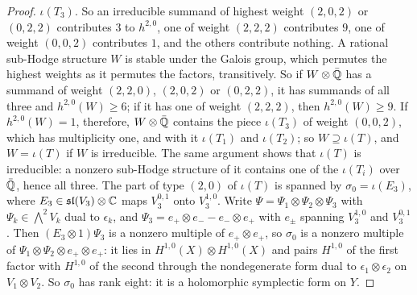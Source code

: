 \begin{proof}
$\iota(T_{3})$. So an irreducible summand of highest weight $(2,0,2)$ or
$(0,2,2)$ contributes $3$ to $h^{2,0}$, one of weight $(2,2,2)$ contributes
$9$, one of weight $(0,0,2)$ contributes $1$, and the others contribute
nothing. A rational sub-Hodge structure $W$ is stable under the Galois group,
which permutes the highest weights as it permutes the factors, transitively.
So if $W\otimes\bar{\mathbb{Q}}$ has a summand of weight $(2,2,0)$, $(2,0,2)$ or
$(0,2,2)$, it has summands of all three and $h^{2,0}(W)\ge6$; if it has one of
weight $(2,2,2)$, then $h^{2,0}(W)\ge9$. If $h^{2,0}(W)=1$, therefore,
$W\otimes\bar{\mathbb{Q}}$ contains the piece $\iota(T_{3})$ of weight $(0,0,2)$,
which has multiplicity one, and with it $\iota(T_{1})$ and $\iota(T_{2})$; so
$W\supseteq\iota(T)$, and $W=\iota(T)$ if $W$ is irreducible. The same
argument shows that $\iota(T)$ is irreducible: a nonzero sub-Hodge structure
of it contains one of the $\iota(T_{i})$ over $\bar{\mathbb{Q}}$, hence all three.
The part of type $(2,0)$ of $\iota(T)$ is spanned by $\sigma_{0}=\iota(E_{3})$,
where $E_{3}\in\mathfrak{sl}(V_{3})\otimes\mathbb{C}$ maps $V_{3}^{0,1}$ onto
$V_{3}^{1,0}$. Write $\Psi=\Psi_{1}\otimes\Psi_{2}\otimes\Psi_{3}$ with
$\Psi_{k}\in\bigwedge^{2}V_{k}$ dual to $\epsilon_{k}$, and
$\Psi_{3}=e_{+}\otimes e_{-}-e_{-}\otimes e_{+}$ with $e_{\pm}$ spanning
$V_{3}^{1,0}$ and $V_{3}^{0,1}$. Then $(E_{3}\otimes1)\Psi_{3}$ is a nonzero
multiple of $e_{+}\otimes e_{+}$, so $\sigma_{0}$ is a nonzero multiple of
$\Psi_{1}\otimes\Psi_{2}\otimes e_{+}\otimes e_{+}$: it lies in
$H^{1,0}(X)\otimes H^{1,0}(X)$ and pairs $H^{1,0}$ of the first factor with
$H^{1,0}$ of the second through the nondegenerate form dual to
$\epsilon_{1}\otimes\epsilon_{2}$ on $V_{1}\otimes V_{2}$. So $\sigma_{0}$ has
rank eight: it is a holomorphic symplectic form on $Y$.


\end{proof}
